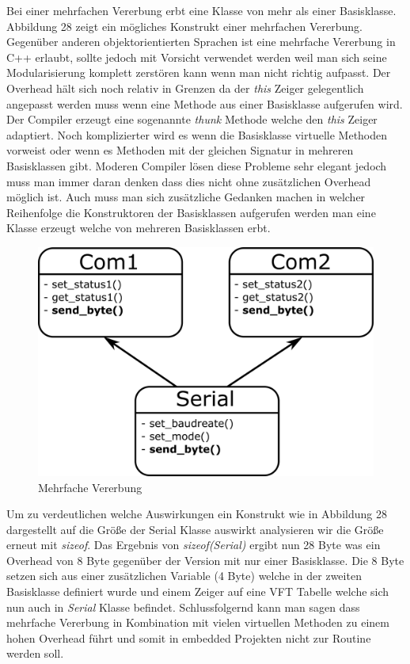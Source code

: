 \documentclass[MES,Master,ngerman]{twbook}%
\begin{document}
Bei einer mehrfachen Vererbung erbt eine Klasse von mehr als einer Basisklasse. Abbildung 28 zeigt ein mögliches Konstrukt einer mehrfachen Vererbung. Gegenüber anderen objektorientierten Sprachen ist eine mehrfache Vererbung in C++ erlaubt, sollte jedoch mit Vorsicht verwendet werden weil man sich seine Modularisierung komplett zerstören kann wenn man nicht richtig aufpasst. Der Overhead hält sich noch relativ in Grenzen da der \textit{this} Zeiger gelegentlich angepasst werden muss wenn eine Methode aus einer Basisklasse aufgerufen wird. Der Compiler erzeugt eine sogenannte \textit{thunk} Methode welche den \textit{this} Zeiger adaptiert. Noch komplizierter wird es wenn die Basisklasse virtuelle Methoden vorweist oder wenn es Methoden mit der gleichen Signatur in mehreren Basisklassen gibt. Moderen Compiler lösen diese Probleme sehr elegant jedoch muss man immer daran denken dass dies nicht ohne zusätzlichen Overhead möglich ist. Auch muss man sich zusätzliche Gedanken machen in welcher Reihenfolge die Konstruktoren der Basisklassen aufgerufen werden man eine Klasse erzeugt welche von mehreren Basisklassen erbt. \newpage
\begin{figure}[h]
	\centering
	\includegraphics[scale=0.65]{../Grafiken/Mehrfache_Vererbung.png}
	\caption{Mehrfache Vererbung}
	\label{fig:37}
\end{figure}

Um zu verdeutlichen welche Auswirkungen ein Konstrukt wie in Abbildung 28 dargestellt auf die Größe der Serial Klasse auswirkt  analysieren wir die Größe erneut mit \textit{sizeof}. Das Ergebnis von \textit{sizeof(Serial)} ergibt nun 28 Byte was ein Overhead von 8 Byte gegenüber der Version mit nur einer Basisklasse. Die 8 Byte setzen sich aus einer zusätzlichen Variable (4 Byte) welche in der zweiten Basisklasse definiert wurde und einem Zeiger auf eine VFT Tabelle welche sich nun auch in \textit{Serial} Klasse befindet. Schlussfolgernd kann man sagen dass mehrfache Vererbung in Kombination mit vielen virtuellen Methoden zu einem hohen Overhead führt und somit in embedded Projekten nicht zur Routine werden soll.
\end{document}
